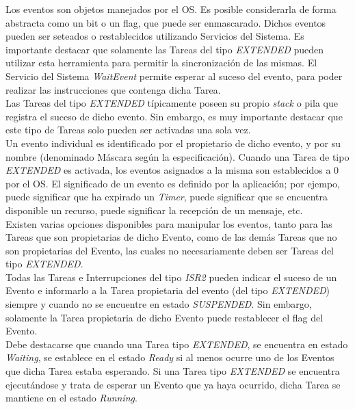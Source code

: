 \documentclass[12pt,letterpaper]{article}
\begin{document}
Los eventos son objetos manejados por el OS. Es posible considerarla de forma abstracta como un bit o un flag, que puede ser enmascarado. Dichos eventos pueden ser seteados o restablecidos utilizando Servicios del Sistema. Es importante destacar que solamente las Tareas del tipo \textit{EXTENDED} pueden utilizar esta herramienta para permitir la sincronización de las mismas. El Servicio del Sistema \textit{WaitEvent} permite esperar al suceso del evento, para poder realizar las instrucciones que contenga dicha Tarea.
 \\
 
Las Tareas del tipo \textit{EXTENDED} típicamente poseen su propio \textit{stack} o pila que registra el suceso de dicho evento. Sin embargo, es muy importante destacar que este tipo de Tareas solo pueden ser activadas una sola vez.
 \\
 
Un evento individual es identificado por el propietario de dicho evento, y por su nombre (denominado Máscara según la especificación). Cuando una Tarea de tipo \textit{EXTENDED} es activada, los eventos asignados a la misma son establecidos a 0 por el OS. El significado de un evento es definido por la aplicación; por ejempo, puede significar que ha expirado un \textit{Timer}, puede significar que se encuentra disponible un recurso, puede significar la recepción de un mensaje, etc.
 \\
 
Existen varias opciones disponibles para manipular los eventos, tanto para las Tareas que son propietarias de dicho Evento, como de las demás Tareas que no son propietarias del Evento, las cuales no necesariamente deben ser Tareas del tipo \textit{EXTENDED}.
 \\
 
Todas las Tareas e Interrupciones del tipo \textit{ISR2} pueden indicar el suceso de un Evento e informarlo a la Tarea propietaria del evento (del tipo \textit{EXTENDED}) siempre y cuando no se encuentre en estado \textit{SUSPENDED}. Sin embargo, solamente la Tarea propietaria de dicho Evento puede restablecer el flag del Evento.
 \\
 
Debe destacarse que cuando una Tarea tipo \textit{EXTENDED}, se encuentra en estado \textit{Waiting}, se establece en el estado \textit{Ready} si al menos ocurre uno de los Eventos que dicha Tarea estaba esperando. Si una Tarea tipo \textit{EXTENDED} se encuentra ejecutándose y trata de esperar un Evento que ya haya ocurrido, dicha Tarea se mantiene en el estado \textit{Running}.
\end{document}
